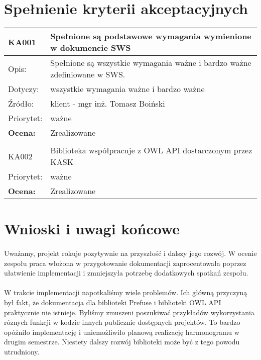 \documentclass[a4paper,10pt]{article}
\begin{document}
\section{Spełnienie kryterii akceptacyjnych}


\begin{center}

\begin{tabular}{|m{3cm}|m{9cm}|} \hline

KA001 & Spełnione są podstawowe wymagania wymienione w dokumencie SWS \\ \hline
Opis: & Spełnione są wszystkie wymagania ważne i bardzo ważne zdefiniowane w SWS. \\ \hline
Dotyczy: & wszystkie wymagania ważne i bardzo ważne \\ \hline
Źródło: & klient - mgr inż. Tomasz Boiński \\ \hline
Priorytet: & ważne  \\ \hline %
\textbf{Ocena:} & Zrealizowane \\ \hline
\multicolumn{2}{c}{} \\
 \hline

KA002 & Biblioteka współpracuje z OWL API dostarczonym przez KASK \\ \hline
Priorytet: & ważne  \\ \hline %
\textbf{Ocena:} & Zrealizowane \\ \hline
\end{tabular}

\end{center}


\section{Wnioski i uwagi końcowe}

\paragraph{} Uważamy, projekt rokuje pozytywnie na przyszłość i dalszy jego rozwój. W ocenie zespołu praca włożona w przygotowanie dokumentacji zaprocentowała poprzez ułatwienie implementacji i zmniejszyła potrzebę dodatkowych spotkań zespołu. 
\paragraph{} W trakcie implementacji napotkaliśmy wiele problemów. Ich główną przyczyną był fakt, że dokumentacja dla biblioteki Prefuse i biblioteki OWL API praktycznie nie istnieje. Byliśmy zmuszeni poszukiwać przykładów wykorzystania róznych funkcji w kodzie innych publicznie dostępnych projektów. To bardzo opóźniło implementację i uniemożliwiło planową realizację harmonogramu w drugim semestrze. Niestety dalszy rozwój biblioteki może być z tego powodu utrudniony. 
\end{document}
